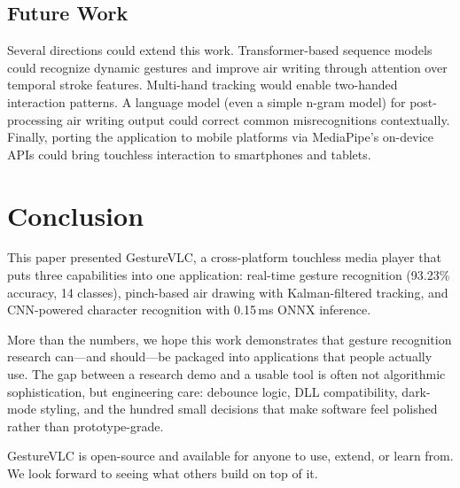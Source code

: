 \documentclass[conference]{IEEEtran}
\begin{document}
\subsection{Future Work}

Several directions could extend this work. Transformer-based sequence models~\cite{xu2023} could recognize dynamic gestures and improve air writing through attention over temporal stroke features. Multi-hand tracking would enable two-handed interaction patterns. A language model (even a simple n-gram model) for post-processing air writing output could correct common misrecognitions contextually. Finally, porting the application to mobile platforms via MediaPipe's on-device APIs could bring touchless interaction to smartphones and tablets.

\section{Conclusion}

This paper presented GestureVLC, a cross-platform touchless media player that puts three capabilities into one application: real-time gesture recognition (93.23\% accuracy, 14 classes), pinch-based air drawing with Kalman-filtered tracking, and CNN-powered character recognition with 0.15\,ms ONNX inference.

More than the numbers, we hope this work demonstrates that gesture recognition research can---and should---be packaged into applications that people actually use. The gap between a research demo and a usable tool is often not algorithmic sophistication, but engineering care: debounce logic, DLL compatibility, dark-mode styling, and the hundred small decisions that make software feel polished rather than prototype-grade.

GestureVLC is open-source and available for anyone to use, extend, or learn from. We look forward to seeing what others build on top of it.
\end{document}
